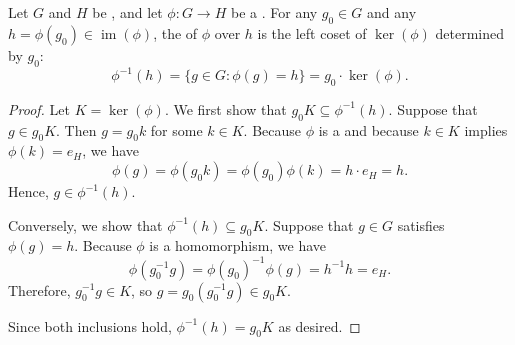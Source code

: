\begin{lemma} \label{lemma:fibers_of_group_homomorphism_are_cosets_of_kernel}
    Let $G$ and $H$ be , and let $\phi : G \to H$ be a . For any $g_0 \in G$ and any $h = \phi(g_0) \in \operatorname{im}(\phi)$, the  of $\phi$ over $h$ is the left coset of $\operatorname{ker}(\phi)$ determined by $g_0$:
    $$\phi^{-1}(h) = \{ g \in G : \phi(g) = h \} = g_0 \cdot \operatorname{ker}(\phi).$$
\end{lemma}
\begin{proof}
    Let $K = \operatorname{ker}(\phi)$. We first show that $g_0 K \subseteq \phi^{-1}(h)$. Suppose that $g \in g_0 K$. Then $g = g_0 k$ for some $k \in K$. Because $\phi$ is a  and because $k \in K$ implies $\phi(k) = e_H$, we have
    $$\phi(g) = \phi(g_0 k) = \phi(g_0) \phi(k) = h \cdot e_H = h.$$
    Hence, $g \in \phi^{-1}(h)$.

    Conversely, we show that $\phi^{-1}(h) \subseteq g_0 K$. Suppose that $g \in G$ satisfies $\phi(g) = h$. Because $\phi$ is a homomorphism, we have
    $$\phi(g_0^{-1} g) = \phi(g_0)^{-1} \phi(g) = h^{-1} h = e_H.$$
    Therefore, $g_0^{-1} g \in K$, so $g = g_0 (g_0^{-1} g) \in g_0 K$.

    Since both inclusions hold, $\phi^{-1}(h) = g_0 K$ as desired.
\end{proof}
